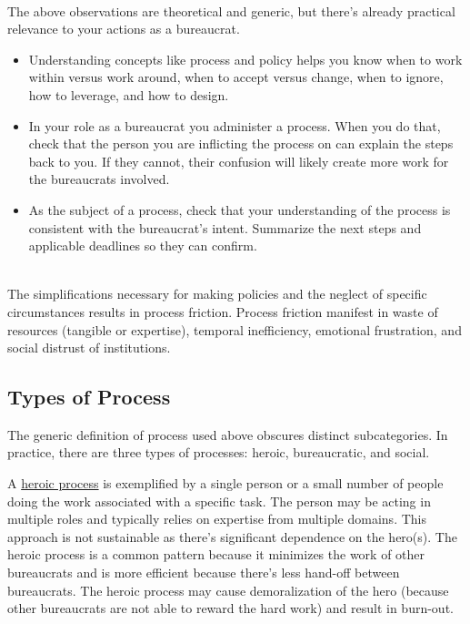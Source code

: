 \ \\

The above observations are theoretical and generic, but there's already practical relevance to your actions as a bureaucrat.
\begin{itemize}
    \item Understanding concepts like process and policy helps you know when to work within versus work around, when to accept versus change, when to ignore, how to leverage, and how to design.
    \item In your role as a bureaucrat you administer a process. When you do that, check that the person you are inflicting the process on can explain the steps back to you. If they cannot, their confusion will likely create more work for the bureaucrats involved. 
%
    \item As the subject of a process, check that your understanding of the process is consistent with the bureaucrat's intent. Summarize the next steps and applicable deadlines so they can confirm. 
\end{itemize}

\ \\

The simplifications necessary for making policies and the neglect of specific circumstances results in \gls{process friction}. Process friction manifest in waste of resources (tangible or expertise), temporal inefficiency, emotional frustration, and social distrust of institutions.



\subsection*{Types of Process}
The generic definition of \gls{process} used above obscures distinct subcategories. In practice, there are three types of processes: heroic, bureaucratic, and social.

A \underline{heroic process} is exemplified by a single person or a small number of people doing the work associated with a specific task. The person may be acting in multiple roles and typically relies on expertise from multiple domains. This approach is not sustainable as there's significant dependence on the hero(s). The heroic process is a common pattern because it minimizes the work of other bureaucrats and is more efficient because there's less hand-off between bureaucrats. The heroic process may cause demoralization of the hero (because other bureaucrats are not able to reward the hard work) and result in burn-out. 

